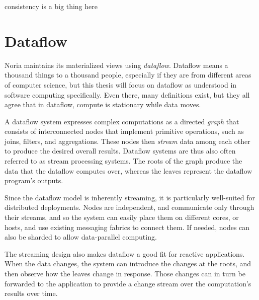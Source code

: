 \begin{comment}
https://www.inf.ufrgs.br/prosoft/publications/2016/mertz-tse-2016-pre-print.pdf
https://people.csail.mit.edu/nickolai/papers/gupta-cachegenie.pdf
https://slack.engineering/flannel-an-application-level-edge-cache-to-make-slack-scale/
https://core.ac.uk/download/pdf/208550345.pdf
https://citeseerx.ist.psu.edu/viewdoc/download?doi=10.1.1.465.343&rep=rep1&type=pdf
https://ieeexplore.ieee.org/document/1319994
\end{comment}

consistency is a big thing here

\section{Dataflow}

Noria maintains its materialized views using \textit{dataflow}. Dataflow means a
thousand things to a thousand people, especially if they are from different
areas of computer science, but this thesis will focus on dataflow as understood
in software computing specifically. Even there, many definitions exist, but they
all agree that in dataflow, compute is stationary while data moves.

A dataflow system expresses complex computations as a directed \emph{graph} that
consists of interconnected nodes that implement primitive operations, such as
joins, filters, and aggregations. These nodes then \emph{stream} data among each
other to produce the desired overall results. Dataflow systems are thus also
often referred to as stream processing systems. The roots of the graph produce
the data that the dataflow computes over, whereas the leaves represent the
dataflow program's outputs.

Since the dataflow model is inherently streaming, it is particularly well-suited
for distributed deployments. Nodes are independent, and communicate only through
their streams, and so the system can easily place them on different cores, or
hosts, and use existing messaging fabrics to connect them. If needed, nodes can
also be sharded to allow data-parallel computing.

The streaming design also makes dataflow a good fit for reactive applications.
When the data changes, the system can introduce the changes at the roots, and
then observe how the leaves change in response. Those changes can in turn be
forwarded to the application to provide a change stream over the computation's
results over time.

